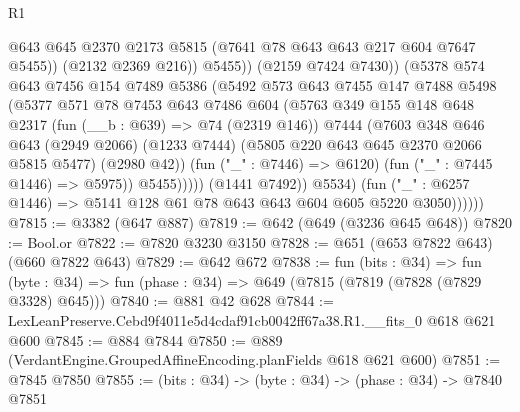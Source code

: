 \begin{lexlean}{R1}
\begin{coremodule}
                                @643
                                @645
                                @2370
                                @2173
                                @5815
                                (@7641 @78 @643 @643 @217 @604 @7647 @5455))
                              (@2132 @2369 @216))
                            @5455))
                        (@2159 @7424 @7430))
                      (@5378
                        @574
                        @643
                        @7456
                        @154
                        @7489
                        @5386
                        (@5492
                          @573
                          @643
                          @7455
                          @147
                          @7488
                          @5498
                          (@5377
                            @571
                            @78
                            @7453
                            @643
                            @7486
                            @604
                            (@5763
                              @349
                              @155
                              @148
                              @648
                              @2317
                              (fun (__b : @639) => @74 (@2319 @146))
                              @7444
                              (@7603
                                @348
                                @646
                                @643
                                (@2949 @2066)
                                (@1233 @7444)
                                (@5805 @220 @643 @645 @2370 @2066 @5815 @5477)
                                (@2980 @42))
                              (fun ("_" : @7446) => @6120)
                              (fun ("_" : @7445 @1446) => @5975))
                            @5455)))))
                  (@1441 @7492))
                @5534)
              (fun ("_" : @6257 @1446) => @5141 @128 @61 @78 @643 @643 @604 @605 @5220 @3050))))))
@7815 := @3382 (@647 @887)
@7819 := @642 (@649 (@3236 @645 @648))
@7820 := Bool.or
@7822 := @7820 @3230 @3150
@7828 := @651 (@653 @7822 @643) (@660 @7822 @643)
@7829 := @642 @672
@7838 := fun (bits : @34) =>
  fun (byte : @34) => fun (phase : @34) => @649 (@7815 (@7819 (@7828 (@7829 @3328) @645)))
@7840 := @881 @42 @628
@7844 := LexLeanPreserve.Cebd9f4011e5d4cdaf91cb0042ff67a38.R1.__fits_0 @618 @621 @600
@7845 := @884 @7844
@7850 := @889 (VerdantEngine.GroupedAffineEncoding.planFields @618 @621 @600)
@7851 := @7845 @7850
@7855 := (bits : @34) -> (byte : @34) -> (phase : @34) -> @7840 @7851

\end{coremodule}
\end{lexlean}

